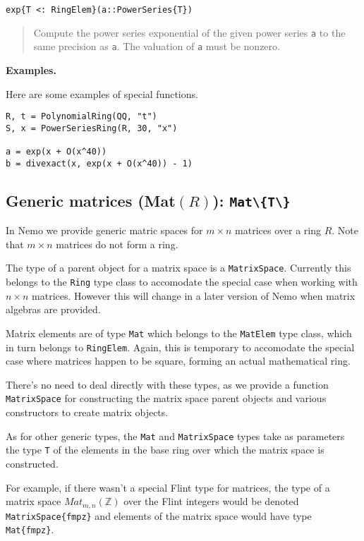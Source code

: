 \documentclass[a4paper,10pt]{article}
\newcommand{\Z}{\mathbb{Z}}
\newcommand{\code}{\lstinline}
\newcommand{\desc}[1]{\vspace{-3mm}\begin{quote}#1\end{quote}}
\begin{document}
\begin{lstlisting}
exp{T <: RingElem}(a::PowerSeries{T})
\end{lstlisting}

\desc{Compute the power series exponential of the given power series \code{a}
to the same precision as \code{a}. The valuation of \code{a} must be nonzero.}

\textbf{Examples.}

Here are some examples of special functions.

\begin{lstlisting}
R, t = PolynomialRing(QQ, "t")
S, x = PowerSeriesRing(R, 30, "x")

a = exp(x + O(x^40))
b = divexact(x, exp(x + O(x^40)) - 1)
\end{lstlisting}

\subsection{Generic matrices (Mat$(R)$): \code|Mat\{T\}|}

In Nemo we provide generic matric spaces for $m\times n$ matrices over a ring $R$.
Note that $m\times n$ matrices do not form a ring.

The type of a parent object for a matrix space is a \code{MatrixSpace}. Currently
this belongs to the \code{Ring} type class to accomodate the special case when
working with $n\times n$ matrices. However this will change in a later version
of Nemo when matrix algebras are provided.

Matrix elements are of type \code{Mat} which belongs to the \code{MatElem} type
class, which in turn belongs to \code{RingElem}. Again, this is temporary to
accomodate the special case where matrices happen to be square, forming an actual
mathematical ring.

There's no need to deal directly with these types, as we provide a function
\code{MatrixSpace} for constructing the matrix space parent objects and various
constructors to create matrix objects.

As for other generic types, the \code{Mat} and \code{MatrixSpace}
types take as parameters the type \code{T} of the elements in the base ring
over which the matrix space is constructed.

For example, if there wasn't a special Flint type for matrices, the type of
a matrix space $Mat_{m, n}(\Z)$ over the Flint integers would be denoted
\code|MatrixSpace{fmpz}| and elements of the matrix space would have type
\code|Mat{fmpz}|.
\end{document}
